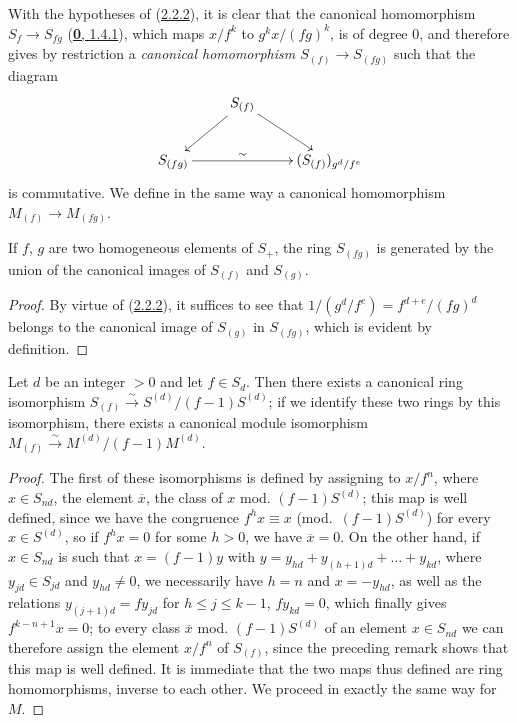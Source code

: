 \begin{env}[2.2.3]
\label{II.2.2.3}
With the hypotheses of (\hyperref[II.2.2.2]{2.2.2}), it is clear that
the canonical homomorphism $S_f\to S_{fg}$
(\hyperref[0.1.4.1]{\textbf{0}, 1.4.1}), which maps $x/f^k$ to
$g^k x/(fg)^k$, is of degree $0$, and therefore gives by restriction a
\emph{canonical homomorphism $S_{(f)}\to S_{(fg)}$} such that the diagram
\[
  \xymatrix{
    & S_{(f)}\ar[dl]\ar[dr]\\
    S_{(fg)}\ar[rr]^-{\sim} && (S_{(f)})_{g^d/f^e}
  }
\]
is commutative. We define in the same way a canonical homomorphism
$M_{(f)}\to M_{(fg)}$.
\end{env}

\begin{lemma}[2.2.4]
\label{II.2.2.4}
If $f$, $g$ are two homogeneous elements of $S_+$, the ring $S_{(fg)}$ is
generated by the union of the canonical images of $S_{(f)}$ and $S_{(g)}$.
\end{lemma}

\begin{proof}
By virtue of (\hyperref[II.2.2.2]{2.2.2}), it suffices to see that
$1/(g^d/f^e)=f^{d+e}/(fg)^d$ belongs to the canonical image of $S_{(g)}$
in $S_{(fg)}$, which is evident by definition.
\end{proof}

\begin{proposition}[2.2.5]
\label{II.2.2.5}
Let $d$ be an integer $>0$ and let $f\in S_d$. Then there exists a canonical
ring isomorphism
$S_{(f)}\xrightarrow{\sim}S^{(d)}/(f-1)S^{(d)}$; if we identify these two
rings by this isomorphism, there exists a canonical module isomorphism
$M_{(f)}\xrightarrow{\sim}M^{(d)}/(f-1)M^{(d)}$.
\end{proposition}

\begin{proof}
The first of these isomorphisms is defined by assigning to
$x/f^n$, where $x\in S_{nd}$, the element $\overline{x}$, the class of $x$
mod. $(f-1)S^{(d)}$; this map is well defined, since we have the congruence
$f^h x\equiv x$ (mod.~$(f-1)S^{(d)}$) for every $x\in S^{(d)}$, so if
$f^h x=0$ for some $h>0$,
we have $\overline{x}=0$. On the other hand, if $x\in S_{nd}$ is such that
$x=(f-1)y$ with
$y=y_{hd}+y_{(h+1)d}+\ldots+y_{kd}$, where $y_{jd}\in S_{jd}$ and
$y_{hd}\neq 0$, we necessarily have $h=n$ and $x=-y_{hd}$, as well as the
relations $y_{(j+1)d}=fy_{jd}$ for $h\leq j\leq k-1$, $fy_{kd}=0$, which
finally gives $f^{k-n+1}x=0$; to every class $\overline{x}$ mod.
$(f-1)S^{(d)}$ of an element $x\in S_{nd}$ we can therefore assign
the element $x/f^n$ of $S_{(f)}$, since the preceding remark shows that this
map is well defined. It is immediate that the two maps thus
defined are ring homomorphisms, inverse to each other. We
proceed in exactly the same way for $M$.
\end{proof}

